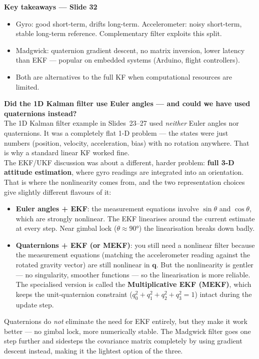 \documentclass[12pt, a4paper]{article}
\begin{document}
\begin{keybox}
  \textbf{Key takeaways --- Slide 32}
  \begin{itemize}[leftmargin=1.4em, topsep=2pt]
    \item Gyro: good short-term, drifts long-term.
          Accelerometer: noisy short-term, stable long-term reference.
          Complementary filter exploits this split.
    \item Madgwick: quaternion gradient descent, no matrix inversion,
          lower latency than EKF --- popular on embedded systems
          (Arduino, flight controllers).
    \item Both are alternatives to the full KF when computational
          resources are limited.
  \end{itemize}
\end{keybox}
\begin{notebox}
  \textbf{Did the 1D Kalman filter use Euler angles --- and could
  we have used quaternions instead?}\\
  The 1D Kalman filter example in Slides~23--27 used \emph{neither}
  Euler angles nor quaternions.
  It was a completely flat 1-D problem --- the states were just
  numbers (position, velocity, acceleration, bias) with no rotation
  anywhere.
  That is why a standard linear KF worked fine.\\[4pt]
  The EKF/UKF discussion was about a different, harder problem:
  \textbf{full 3-D attitude estimation}, where gyro readings are
  integrated into an orientation.
  That is where the nonlinearity comes from, and the two
  representation choices give slightly different flavours of it:
  \begin{itemize}[leftmargin=1.4em, topsep=4pt]
    \item \textbf{Euler angles + EKF}: the measurement equations
          involve $\sin\theta$ and $\cos\theta$, which are strongly
          nonlinear.
          The EKF linearises around the current estimate at every
          step.
          Near gimbal lock ($\theta \approx 90°$) the linearisation
          breaks down badly.
    \item \textbf{Quaternions + EKF (or MEKF)}: you still need a
          nonlinear filter because the measurement equations
          (matching the accelerometer reading against the rotated
          gravity vector) are still nonlinear in $\mathbf{q}$.
          But the nonlinearity is gentler --- no singularity, smoother
          functions --- so the linearisation is more reliable.
          The specialised version is called the
          \textbf{Multiplicative EKF (MEKF)}, which keeps the
          unit-quaternion constraint
          ($q_0^2+q_1^2+q_2^2+q_3^2 = 1$) intact during the update
          step.
  \end{itemize}
  Quaternions do \emph{not} eliminate the need for EKF entirely, but
  they make it work better --- no gimbal lock, more numerically
  stable.
  The Madgwick filter goes one step further and sidesteps the
  covariance matrix completely by using gradient descent instead,
  making it the lightest option of the three.
\end{notebox}
\end{document}
